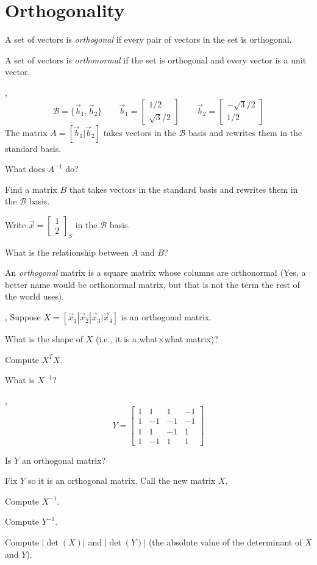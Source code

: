 \documentclass{article}
\newcommand{\mat}[1]{\begin{bmatrix}#1\end{bmatrix}}
\begin{document}
\section*{Orthogonality}
	\begin{Def}
		A set of vectors is \emph{orthogonal} if every pair of vectors
		in the set is orthogonal.
	\end{Def}

	\begin{Def}
		A set of vectors is \emph{orthonormal} if the set is orthogonal
		and every vector is a unit vector.
	\end{Def}

	\sep
	\[
		\mathcal B=\{\vec b_1,\vec b_2\}\qquad\vec b_1=\mat{1/2\\\sqrt{3}/2}
		\qquad \vec b_2=\mat{-\sqrt{3}/2\\1/2}
	\]
	The matrix $A=[\vec b_1|\vec b_2]$ takes vectors in the $\mathcal B$ basis
	and rewrites them in the standard basis.
	\begin{Enum}
		\item What does $A^{-1}$ do?
		\item Find a matrix $B$ that takes vectors in the standard basis
			and rewrites them in the $\mathcal B$ basis.
		\item Write $\vec x=\mat{1\\2}_S$ in the $\mathcal B$ basis.
		\item What is the relationship between $A$ and $B$?
	\end{Enum}

	\begin{Def}
		An \emph{orthogonal} matrix is a square matrix whose columns are
		orthonormal (Yes, a better name would be orthonormal matrix, but that
		is not the term the rest of the world uses).
	\end{Def}

	\sep
	Suppose $X=[\vec x_1|\vec x_2|\vec x_3|\vec x_4]$ is an orthogonal matrix.
	\begin{Enum}
		\item What is the shape of $X$ (i.e., it is a what$\times$what matrix)?
		\item Compute $X^TX$.
		\item What is $X^{-1}$?
	\end{Enum}

	\sep
	\[
		Y=\mat{1&1&1&-1\\1&-1&-1&-1\\1&1&-1&1\\1&-1&1&1}
	\]
	\begin{Enum}
		\item Is $Y$ an orthogonal matrix?
		\item Fix $Y$ so it is an orthogonal matrix.  Call the new matrix $X$.
		\item Compute $X^{-1}$.
		\item Compute $Y^{-1}$.
		\item Compute $|\det(X)|$ and $|\det(Y)|$ (the absolute value of
			the determinant of $X$ and $Y$).
	\end{Enum}
\end{document}
